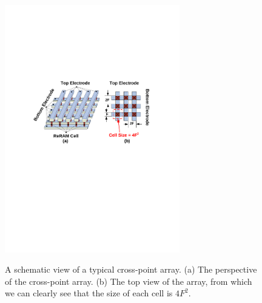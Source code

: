 \begin{figure}
\centering
  \includegraphics[width=3in]{./figures/crossbar_array2.pdf}\\\vspace{-10pt}
  \caption{A schematic view of a typical cross-point array. (a) The perspective of the cross-point array.
  (b) The top view of the array, from which we can clearly see that the size of each cell is $4F^2$. }\label{fig:array}
\vspace{-12pt}
\end{figure}

